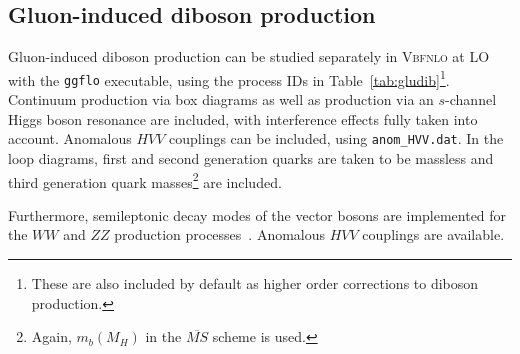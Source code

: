 \documentclass[english,12pt]{article}
\begin{document}
\subsection{Gluon-induced diboson production}

%
Gluon-induced diboson production can be studied separately in \textsc{Vbfnlo} at
LO with the {\tt ggflo} executable, using the process IDs in
Table~\ref{tab:gludib}\footnote{These are also included by default as higher
order corrections to diboson production.}.  Continuum production via box
diagrams as well as production via an $s$-channel Higgs boson resonance are included, with
interference effects fully taken into account.  Anomalous $HVV$ couplings can be
included, using {\tt anom\_HVV.dat}.  In the loop diagrams, first and second generation quarks are taken to
be massless and third generation quark masses\footnote{Again, $m_{b}(M_{H})$ in the $\overline{MS}$ scheme is used.} are included.

Furthermore, semileptonic decay modes of the vector bosons are implemented
for the $WW$ and $ZZ$ production processes~\cite{semilep}. 
Anomalous $HVV$ couplings are available.
\end{document}
